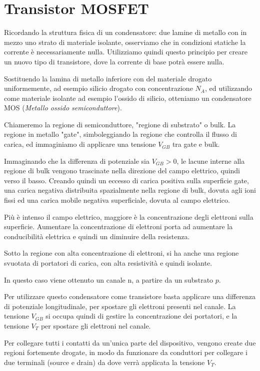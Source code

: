 \documentclass[../template]{subfiles}
\begin{document}
\section{Transistor MOSFET}
Ricordando la struttura fisica di un condensatore: due lamine di metallo con in mezzo uno strato di materiale isolante, osserviamo che in condizioni statiche la corrente è necessariamente nulla.
Utilizziamo quindi questo principio per creare un nuovo tipo di transistore, dove la corrente di base potrà essere nulla.

Sostituendo la lamina di metallo inferiore con del materiale drogato uniformemente, ad esempio silicio drogato con concentrazione $N_A$, ed utilizzando come materiale isolante ad esempio l'ossido di silicio, otteniamo un condensatore MOS (\textit{Metallo ossido semiconduttore}).

Chiameremo la regione di semiconduttore, "regione di substrato" o bulk. La regione in metallo "gate", simboleggiando la regione che controlla il flusso di carica, ed immaginiamo di applicare una tensione $V_{GB}$ tra gate e bulk.

Immaginando che la differenza di potenziale sia $V_{GB} > 0$, le lacune interne alla regione di bulk vengono trascinate nella direzione del campo elettrico, quindi verso il basso. Creando quindi un eccesso di carica positiva sulla superficie gate, una carica negativa distribuita spazialmente nella regione di bulk, dovuta agli ioni fissi ed una carica mobile negativa superficiale, dovuta al campo elettrico.

Più è intenso il campo elettrico, maggiore è la concentrazione degli elettroni sulla superficie. Aumentare la concentrazione di elettroni porta ad aumentare la conducibilità elettrica e quindi un diminuire della resistenza.

Sotto la regione con alta concentrazione di elettroni, si ha anche una regione svuotata di portatori di carica, con alta resistività e quindi isolante.

In questo caso viene ottenuto un canale n, a partire da un substrato $p$.

Per utilizzare questo condensatore come transistore basta applicare una differenza di potenziale longitudinale, per spostare gli elettroni presenti nel canale. La tensione $V_{GB}$ si occupa quindi di gestire la concentrazione dei portatori, e la tensione $V_T$ per spostare gli elettroni nel canale.


Per collegare tutti i contatti da un'unica parte del dispositivo, vengono create due regioni fortemente drogate, in modo da funzionare da conduttori per collegare i due terminali (source e drain) da dove verrà applicata la tensione $V_T$.
\end{document}
